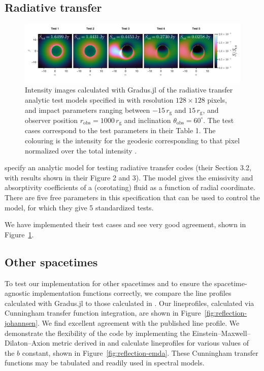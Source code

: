 \documentclass[fleqn,usenatbib]{mnras}
\newcommand{\software}[1]{{\sc #1}}
\newcommand{\Gradus}{\software{Gradus.jl}\xspace}
\newcommand{\rg}{r_\text{g}}
\begin{document}
\subsection{Radiative transfer}

\begin{figure}
    \centering
    \includegraphics[width=0.99\linewidth]{figures/radiative-transfer.gold.pdf}
    \caption{Intensity images calculated with \Gradus of the radiative transfer
    analytic test models specified in \citet{gold_verification_2020} with
    resolution $128 \times 128$ pixels, and impact parameters ranging between $-15\,
    \rg$ and $15\, \rg$, and observer position $r_\text{obs} = 1000\, \rg$ and
    inclination $\theta_\text{obs} = 60^\circ$. The test cases correspond to the
    test parameters in their Table 1. The colouring is the intensity for the
    geodesic corresponding to that pixel normalized over the total intensity .}
    \label{fig:gold-test-problems}
\end{figure}

\cite{gold_verification_2020} specify an analytic model for testing radiative
transfer codes (their Section 3.2, with results shown in their Figure 2 and 3).
The model gives the emissivity and absorptivity coefficients of a (corotating)
fluid as a function of radial coordinate. There are five free parameters in this
specification that can be used to control the model, for which they give 5
standardized tests.

We have implemented their test cases and see very good agreement, shown in
Figure~\ref{fig:gold-test-problems}.

\subsection{Other spacetimes}

To test our implementation for other spacetimes and to ensure the
spacetime-agnostic implementation functions correctly, we compare the line
profiles calculated with \Gradus to those calculated in
\citet{johannsen_testing_2013}. Our lineprofiles, calculated via Cunningham
transfer function integration, are shown in
Figure~\ref{fig:reflection-johannsen}. We find excellent agreement with the
published line profile. We demonstrate the flexibility of the code by
implementing the Einstein--Maxwell--Dilaton--Axion metric derived in
\citet{garcia_class_1995} and calculate lineprofiles for various values of the
$b$ constant, shown in Figure~\ref{fig:reflection-emda}. These Cunningham
transfer functions may be tabulated and readily used in spectral models.
\end{document}
